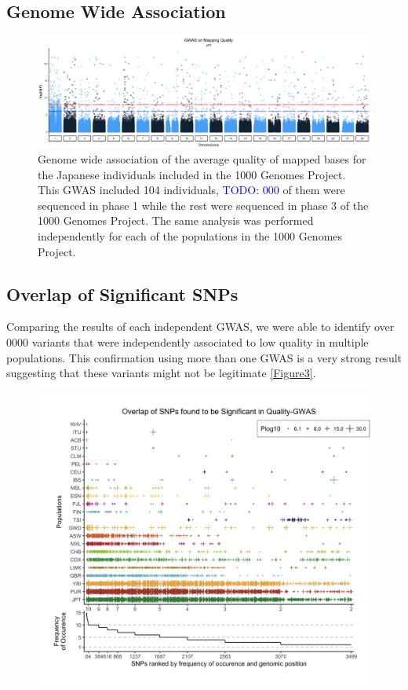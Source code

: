 \documentclass[12pt]{amsart}
\newcommand{\todo}[1]{\textcolor{blue}{TODO: #1}}
\begin{document}
{	\subsection{Genome Wide Association}


\begin{figure}
\includegraphics[width=\hsize,keepaspectratio]{GWAS_Qual_GenomeWide_JPT.jpg}
\caption{Genome wide association of the average quality of mapped bases for the Japanese individuals included in the 1000 Genomes Project. This GWAS included 104 individuals, \todo{000} of them were sequenced in phase 1 while the rest were sequenced in phase 3 of the 1000 Genomes Project. The same analysis was performed independently for each of the populations in the 1000 Genomes Project. }
 \label{Figure2}
\end{figure}

	\subsection{Overlap of Significant SNPs}
Comparing the results of each independent GWAS, we were able to identify over 0000 variants that were independently associated to low quality in multiple populations. This confirmation using more than one GWAS is a very strong result suggesting that these variants might not be legitimate  \ref{Figure3}. 

\begin{figure}
\includegraphics[width=\hsize,keepaspectratio]{SNPOverlap6.jpg}


\end{figure}}
\end{document}
